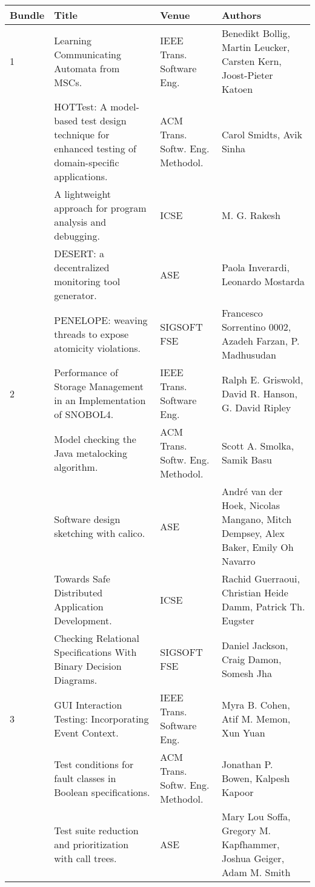 \begin{table}[h]
  \centering
  \resizebox{\textwidth}{!} {
    \begin{tabular}{|llll|}
    \hline
    Bundle & Title & Venue & Authors \\
    \hline
\rowcolor{black!20}    1	& Learning Communicating Automata from MSCs.& IEEE Trans. Software 
Eng.& Benedikt Bollig, Martin Leucker, Carsten Kern, Joost-Pieter Katoen \\
	& HOTTest: A model-based test design technique for enhanced testing of domain-specific 
applications.& ACM Trans. Softw. Eng. Methodol.& Carol Smidts, Avik Sinha \\
\rowcolor{black!20}	& A lightweight approach for program analysis and debugging.& ICSE& M. G. 
Rakesh \\
	& DESERT: a decentralized monitoring tool generator.& ASE& Paola Inverardi, Leonardo 
Mostarda \\
\rowcolor{black!20}	& PENELOPE: weaving threads to expose atomicity violations.& SIGSOFT FSE& 
Francesco Sorrentino 0002, Azadeh Farzan, P. Madhusudan \\
    2	& Performance of Storage Management in an Implementation of SNOBOL4.& IEEE Trans. Software 
Eng.& Ralph E. Griswold, David R. Hanson, G. David Ripley \\
\rowcolor{black!20}	& Model checking the Java metalocking algorithm.& ACM Trans. Softw. Eng. 
Methodol.& Scott A. Smolka, Samik Basu \\
	& Software design sketching with calico.& ASE& André van der Hoek, Nicolas Mangano, Mitch 
Dempsey, Alex Baker, Emily Oh Navarro \\
\rowcolor{black!20}	& Towards Safe Distributed Application Development.& ICSE& Rachid 
Guerraoui, 
Christian Heide Damm, Patrick Th. Eugster \\
	& Checking Relational Specifications With Binary Decision Diagrams.& SIGSOFT FSE& Daniel 
Jackson, Craig Damon, Somesh Jha \\
\rowcolor{black!20}    3	& GUI Interaction Testing: Incorporating Event Context.& IEEE 
Trans. 
Software Eng.& Myra B. Cohen, Atif M. Memon, Xun Yuan \\
	& Test conditions for fault classes in Boolean specifications.& ACM Trans. Softw. Eng. 
Methodol.& Jonathan P. Bowen, Kalpesh Kapoor \\
\rowcolor{black!20}	& Test suite reduction and prioritization with call trees.& ASE& Mary Lou 
Soffa, Gregory M. Kapfhammer, Joshua Geiger, Adam M. Smith \\

\end{tabular}}
\end{table}
